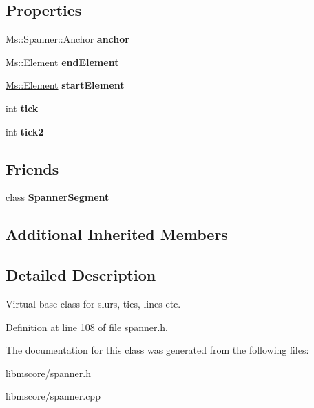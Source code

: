 \subsection*{Properties}
\begin{DoxyCompactItemize}
\item 
\mbox{\label{class_ms_1_1_spanner_a0dd6123a314b6b2fc907a01305908d1a}} 
Ms\+::\+Spanner\+::\+Anchor {\bfseries anchor}
\item 
\mbox{\label{class_ms_1_1_spanner_a516ec9efb531441bb85129818616ef2b}} 
\hyperlink{class_ms_1_1_element}{Ms\+::\+Element} {\bfseries end\+Element}
\item 
\mbox{\label{class_ms_1_1_spanner_a3891e45b9c643ecc7d6d65de3905b9dc}} 
\hyperlink{class_ms_1_1_element}{Ms\+::\+Element} {\bfseries start\+Element}
\item 
\mbox{\label{class_ms_1_1_spanner_ac8c49b97d084e18c85f66964209c9a29}} 
int {\bfseries tick}
\item 
\mbox{\label{class_ms_1_1_spanner_afe0a900314f98fcbc4b783d263bcb91a}} 
int {\bfseries tick2}
\end{DoxyCompactItemize}
\subsection*{Friends}
\begin{DoxyCompactItemize}
\item 
\mbox{\label{class_ms_1_1_spanner_a99ed65b91996904d928afe2e94e18b86}} 
class {\bfseries Spanner\+Segment}
\end{DoxyCompactItemize}
\subsection*{Additional Inherited Members}


\subsection{Detailed Description}
Virtual base class for slurs, ties, lines etc. 

Definition at line 108 of file spanner.\+h.



The documentation for this class was generated from the following files\+:\begin{DoxyCompactItemize}
\item 
libmscore/spanner.\+h\item 
libmscore/spanner.\+cpp\end{DoxyCompactItemize}
